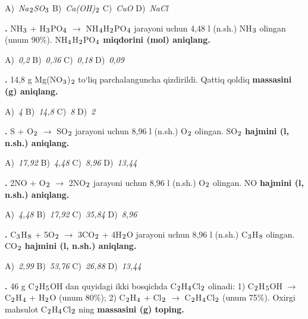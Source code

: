 \documentclass[11pt,a4paper]{article}
\renewcommand{\textsubscript}[1]{\ensuremath{_{\text{\fontsize{8}{8}\selectfont #1}}}}
\newcommand{\qn}[1]{\textbf{\fontsize{11.5}{13}\selectfont #1}}
\newcommand{\qsep}{\par\vspace{1pt}\noindent\rule{0pt}{0.4pt}\par\vspace{5pt}}
\begin{document}
\begin{multicols}{2}
\noindent A)~\textsl{Na\textsubscript{2}SO\textsubscript{3}} \hfill B)~\textsl{Ca(OH)\textsubscript{2}} \hfill C)~\textsl{CuO} \hfill D)~\textsl{NaCl}\par
\qsep
\noindent\qn{16.} NH\textsubscript{3} + H\textsubscript{3}PO\textsubscript{4} $\to$ NH\textsubscript{4}H\textsubscript{2}PO\textsubscript{4} jarayoni uchun 4,48 l (n.sh.) NH\textsubscript{3} olingan (unum 90\%). NH\textsubscript{4}H\textsubscript{2}PO\textsubscript{4} \textbf{miqdorini (mol) aniqlang.}

\noindent A)~\textsl{0,2} \hfill B)~\textsl{0,36} \hfill C)~\textsl{0,18} \hfill D)~\textsl{0,09}\par
\qsep
\noindent\qn{17.} 14,8 g Mg(NO\textsubscript{3})\textsubscript{2} to`liq parchalanguncha qizdirildi. Qattiq qoldiq \textbf{massasini (g) aniqlang.}

\noindent A)~\textsl{4} \hfill B)~\textsl{14,8} \hfill C)~\textsl{8} \hfill D)~\textsl{2}\par
\qsep
\noindent\qn{18.} S + O\textsubscript{2} $\to$ SO\textsubscript{2} jarayoni uchun 8,96 l (n.sh.) O\textsubscript{2} olingan. SO\textsubscript{2} \textbf{hajmini (l, n.sh.) aniqlang.}

\noindent A)~\textsl{17,92} \hfill B)~\textsl{4,48} \hfill C)~\textsl{8,96} \hfill D)~\textsl{13,44}\par
\qsep
\noindent\qn{19.} 2NO + O\textsubscript{2} $\to$ 2NO\textsubscript{2} jarayoni uchun 8,96 l (n.sh.) O\textsubscript{2} olingan. NO \textbf{hajmini (l, n.sh.) aniqlang.}

\noindent A)~\textsl{4,48} \hfill B)~\textsl{17,92} \hfill C)~\textsl{35,84} \hfill D)~\textsl{8,96}\par
\qsep
\noindent\qn{20.} C\textsubscript{3}H\textsubscript{8} + 5O\textsubscript{2} $\to$ 3CO\textsubscript{2} + 4H\textsubscript{2}O jarayoni uchun 8,96 l (n.sh.) C\textsubscript{3}H\textsubscript{8} olingan. CO\textsubscript{2} \textbf{hajmini (l, n.sh.) aniqlang.}

\noindent A)~\textsl{2,99} \hfill B)~\textsl{53,76} \hfill C)~\textsl{26,88} \hfill D)~\textsl{13,44}\par
\qsep
\noindent\qn{21.} 46 g C\textsubscript{2}H\textsubscript{5}OH dan quyidagi ikki bosqichda C\textsubscript{2}H\textsubscript{4}Cl\textsubscript{2} olinadi: 1) C\textsubscript{2}H\textsubscript{5}OH $\to$ C\textsubscript{2}H\textsubscript{4} + H\textsubscript{2}O (unum 80\%); 2) C\textsubscript{2}H\textsubscript{4} + Cl\textsubscript{2} $\to$ C\textsubscript{2}H\textsubscript{4}Cl\textsubscript{2} (unum 75\%). Oxirgi mahsulot C\textsubscript{2}H\textsubscript{4}Cl\textsubscript{2} ning \textbf{massasini (g) toping.}


\end{multicols}
\end{document}
